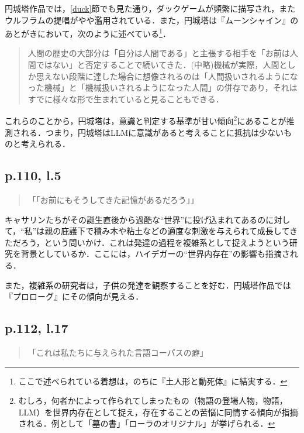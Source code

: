 \documentclass[10pt, a5paper, twoside]{ltjsarticle}
\begin{document}
            円城塔作品では，\ref{duck}節でも見た通り，ダックゲームが頻繁に描写され，またウルフラムの提唱がやや濫用されている．また，円城塔は『ムーンシャイン』のあとがきにおいて，次のように述べている\footnote{ここで述べられている着想は，のちに『土人形と動死体』に結実する．}\cite{moonshine}．

            \begin{quotation}
                人間の歴史の大部分は「自分は人間である」と主張する相手を「お前は人間ではない」と否定することで続いてきた．(中略)機械が実際，人間としか思えない段階に達した場合に想像されるのは「人間扱いされるようになった機械」と「機械扱いされるようになった人間」の併存であり，それはすでに様々な形で生まれていると見ることもできる．
            \end{quotation}

            これらのことから，円城塔は，意識と判定する基準が甘い傾向\footnote{むしろ，何者かによって作られてしまったもの（物語の登場人物，物語，LLM）を世界内存在として捉え，存在することの苦悩に同情する傾向が指摘される．例として「墓の書」「ローラのオリジナル」が挙げられる．}にあることが推測される．つまり，円城塔はLLMに意識があると考えることに抵抗は少ないものと考えられる．

        \subsection{p.110, l.5}

            \begin{quote}
                「「お前にもそうしてきた記憶があるだろう」」
            \end{quote}

            キャサリンたちがその誕生直後から過酷な“世界”に投げ込まれてあるのに対して，“私”は親の庇護下で積み木や粘土などの適度な刺激を与えられて成長してきただろう，という問いかけ．これは発達の過程を複雑系として捉えようという研究を背景としているか．ここには，ハイデガーの“世界内存在”の影響も指摘される．

            また，複雑系の研究者は，子供の発達を観察することを好む．円城塔作品では『プロローグ』にその傾向が見える．

        \subsection{p.112, l.17}

            \begin{quote}
                「これは私たちに与えられた言語コーパスの癖」
            \end{quote}
\end{document}
